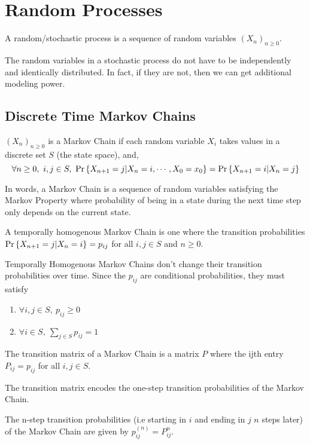 \section{Random Processes}
\begin{definition}
	A random/stochastic process is a sequence of random variables $(X_n)_{n\geq 0}$.
	\label{defn:random-process}
\end{definition}
The random variables in a stochastic process do not have to be independently and identically distributed.
In fact, if they are not, then we can get additional modeling power.
\subsection{Discrete Time Markov Chains}
\begin{definition}
	$(X_n)_{n\geq 0}$ is a Markov Chain if each random variable $X_i$ takes values in a discrete set $S$ (the state space), and, \[
		\forall n \geq 0,\ i,j\in S,\ \pr{X_{n+1}=j|X_n=i,\cdots,X_0=x_0} = \pr{X_{n+1}=i|X_n=j}
	\]
	\label{defn:markov-chain}
\end{definition}
In words, a Markov Chain is a sequence of random variables satisfying the Markov Property where probability of being in a state during the next time step only depends on the current state.
\begin{definition}
	A temporally homogenous Markov Chain is one where the transition probabilities $\text{Pr}\left\{X_{n+1}=j|X_n=i\right\} = p_{ij}$ for all $i,j\in S$ and $n\geq 0$.
	\label{defn:temp-homo-markov-chain}
\end{definition}
Temporally Homogenous Markov Chains don't change their transition probabilities over time.
Since the $p_{ij}$ are conditional probabilities, they must satisfy
\begin{enumerate}
	\item $\forall i,j\in S,\ p_{ij} \geq 0$
	\item $\forall i\in S,\ \sum_{j\in S}p_{ij} = 1$
\end{enumerate}
\begin{definition}
	The transition matrix of a Markov Chain is a matrix $P$ where the ijth entry $P_{ij} = p_{ij}$ for all $i,j\in S$.
	\label{defn:transition-mat}
\end{definition}
The transition matrix encodes the one-step transition probabilities of the Markov Chain.
\begin{theorem}
	The n-step transition probabilities (i.e starting in $i$ and ending in $j$ $n$ steps later) of the Markov Chain are given by $p_{ij}^{(n)} = P^n_{ij}$.
	\label{thm:chapman-kolmogorov}
\end{theorem}
